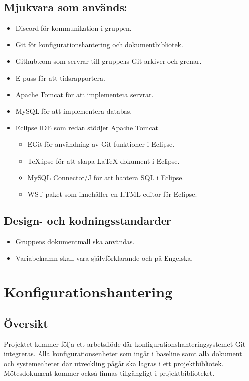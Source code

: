 \documentclass[paper=a4, fontsize=11pt,twoside]{article}
\begin{document}
\subsection*{Mjukvara som används:}
	\begin{itemize}
	\item Discord för kommunikation i gruppen.
	\item Git för konfigurationshantering och dokumentbibliotek.
	\item Github.com som servrar till gruppens Git-arkiver och grenar.
	\item E-puss för att tidsrapportera.
	\item Apache Tomcat för att implementera servrar.
	\item MySQL för att implementera databas.
	\item Eclipse IDE som redan stödjer Apache Tomcat
		\begin{itemize}
		\item EGit för användning av Git funktioner i Eclipse.
		\item TeXlipse för att skapa LaTeX dokument i Eclipse.
		\item MySQL Connector/J för att hantera SQL i Eclipse.
		\item WST paket som innehåller en HTML editor för Eclipse. 
		\end{itemize}
	\end{itemize}

\subsection*{Design- och kodningsstandarder}
	\begin{itemize}
	\item Gruppens dokumentmall ska användas.
	\item Variabelnamn skall vara självförklarande och på Engelska.
\end{itemize}



\section{Konfigurationshantering}
\subsection*{Översikt}
Projektet kommer följa ett arbetsflöde där konfigurationshanteringsystemet Git
integreras. Alla konfigurationsenheter som ingår i baseline samt alla dokument och systemenheter där utveckling pågår ska lagras i ett projektbibliotek. Mötesdokument kommer också finnas tillgängligt i projektbiblioteket.
 
\end{document}
